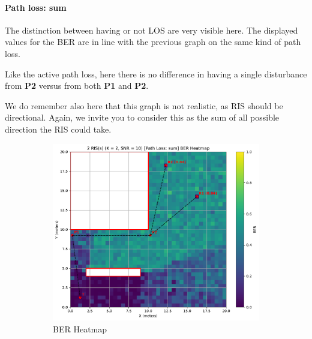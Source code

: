\newpage
\paragraph*{Path loss: sum}
The distinction between having or not LOS are very visible here. The displayed values for the BER are in line with the previous graph on the same kind of path loss.

Like the active path loss, here there is no difference in having a single disturbance from \textbf{P2} versus from both \textbf{P1} and \textbf{P2}.

We do remember also here that this graph is not realistic, as RIS should be directional. Again, we invite you to consider this as the sum of all possible direction the RIS could take.

\begin{figure}[H]
  \centering
  \begin{subfigure}[b]{0.48\textwidth}
    \centering
    \includegraphics[width=\textwidth]{imgs/heatmap-simulations/2 RIS(s) (K = 2, SNR = 10) [Path Loss: sum] BER Heatmap.pdf}
    \caption{BER Heatmap}
  \end{subfigure}
  \hfill
  \begin{subfigure}[b]{0.48\textwidth}
    \centering

\end{subfigure}
\end{figure}
